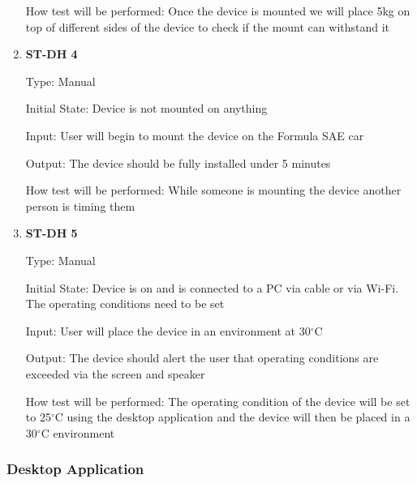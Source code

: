 \documentclass[12pt, titlepage]{article}
\begin{document}
\begin{enumerate}
              
    How test will be performed: Once the device is mounted we will place 5kg on top of different sides of the device to check if the mount can withstand it \\

    \item{\bf{ST-DH 4}}
    
    Type: Manual
              
    Initial State: Device is not mounted on anything
              
    Input: User will begin to mount the device on the Formula SAE car
              
    Output: The device should be fully installed under 5 minutes
    
              
    How test will be performed: While someone is mounting the device another person is timing them \\

    \item{\bf{ST-DH 5}}
    
    Type: Manual
              
    Initial State: Device is on and is connected to a PC via cable or via Wi-Fi. The operating conditions need to be set
              
    Input: User will place the device in an environment at 30$^{\circ}$C
              
    Output: The device should alert the user that operating conditions are exceeded via the screen and speaker
    
              
    How test will be performed: The operating condition of the device will be set to 25$^{\circ}$C using the desktop application and the device will then be placed in a 30$^{\circ}$C environment\\
  
    \end{enumerate}


\subsubsection{Desktop Application}
\end{document}
